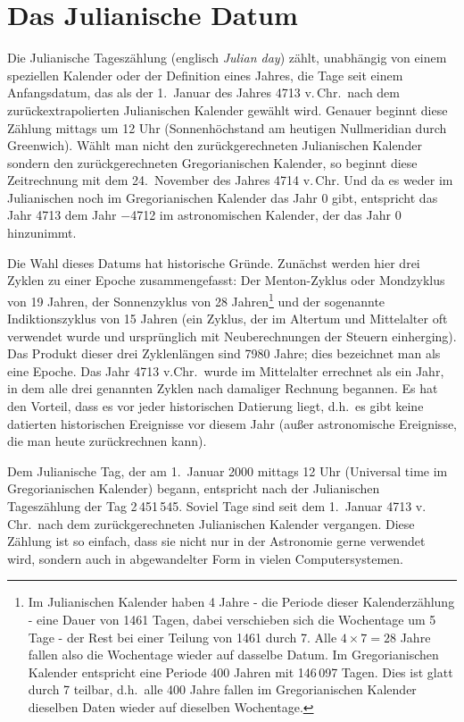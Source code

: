 \section{Das Julianische Datum}

Die Julianische Tagesz\"ahlung (englisch \textit{Julian day}) z\"ahlt, unabh\"angig von einem 
speziellen Kalender oder der Definition eines Jahres,
die Tage seit einem Anfangsdatum, das als der 1.\ Januar des Jahres 4713 v.\,Chr.\ nach dem
zur\"uckextrapolierten Julianischen Kalender gew\"ahlt wird. Genauer beginnt diese Z\"ahlung mittags
um 12 Uhr (Sonnenh\"ochstand am heutigen Nullmeridian durch Greenwich). W\"ahlt man nicht den
zur\"uckgerechneten Julianischen Kalender sondern den zur\"uckgerechneten Gregorianischen
Kalender, so beginnt diese Zeitrechnung mit dem 24.\ November des Jahres 4714 v.\,Chr. Und da es
weder im Julianischen noch im Gregorianischen Kalender das Jahr 0 gibt, entspricht das Jahr 4713 dem
Jahr $-$4712 im astronomischen Kalender, der das Jahr 0 hinzunimmt. 

Die Wahl dieses Datums hat historische Gr\"unde. Zun\"achst werden hier drei Zyklen zu einer
Epoche zusammengefasst: Der Menton-Zyklus 
oder Mondzyklus von 19 Jahren, der Sonnenzyklus
von 28 Jahren\footnote{Im Julianischen Kalender haben 4 Jahre - die Periode dieser Kalenderz\"ahlung - 
eine Dauer von 1461 Tagen, dabei verschieben
sich die Wochentage um 5 Tage - der Rest bei einer Teilung von 1461 durch 7. 
Alle $4\times 7=28$ Jahre fallen also die Wochentage wieder auf dasselbe Datum. Im
Gregorianischen Kalender entspricht eine Periode 400 Jahren mit 146\,097 Tagen. Dies ist glatt durch 7 teilbar,
d.h.\ alle 400 Jahre fallen im Gregorianischen Kalender dieselben Daten wieder auf dieselben Wochentage.}
und der sogenannte Indiktionszyklus 
von 15 Jahren (ein Zyklus, der im Altertum und Mittelalter
oft verwendet wurde und urspr\"unglich mit Neuberechnungen der Steuern einherging). 
Das Produkt dieser drei Zyklenl\"angen sind
7980 Jahre; dies bezeichnet man als eine Epoche. Das Jahr 4713 v.Chr.\ wurde im Mittelalter errechnet
als ein Jahr, in dem alle drei genannten Zyklen nach damaliger Rechnung begannen. Es hat den Vorteil, dass
es vor jeder historischen Datierung liegt, d.h.\ es gibt keine datierten historischen Ereignisse vor diesem
Jahr (au\ss er astronomische Ereignisse, die man heute zur\"uckrechnen kann). 

Dem Julianische Tag, der am 1.\ Januar 2000 mittags 12 Uhr (Universal time im Gregorianischen Kalender) begann, 
entspricht nach der Julianischen Tagesz\"ahlung  der Tag 2\,451\,545. Soviel Tage sind seit dem 1.\ Januar 4713 v.\,Chr.\
nach dem zur\"uckgerechneten Julianischen Kalender vergangen. Diese Z\"ahlung ist so einfach, dass
sie nicht nur in der Astronomie gerne verwendet wird, sondern auch in abgewandelter
Form in vielen Computersystemen. 

